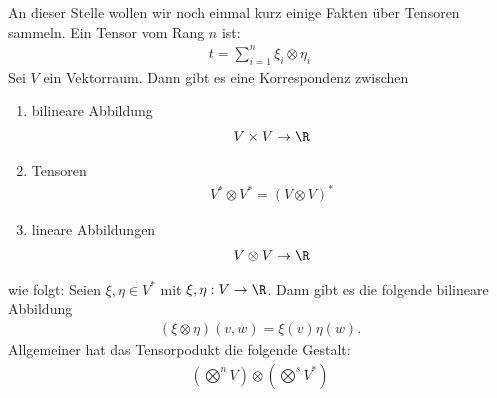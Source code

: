 An dieser Stelle wollen wir noch einmal kurz einige Fakten über Tensoren sammeln.
Ein Tensor vom Rang $n$ ist:
\begin{align}
t = \sum^n_{i=1} \xi_i \otimes \eta_i
\end{align}
Sei $V$ ein Vektorraum. 
Dann gibt es eine Korrespondenz zwischen
\begin{enumerate}
\item bilineare Abbildung 
\begin{align}
V \times V \to \R
\end{align}
\item Tensoren 
\begin{align}
V^* \otimes V^* = (V \otimes V)^*
\end{align}
\item lineare Abbildungen
\begin{align}
V \otimes V \to \R
\end{align}
\end{enumerate}
wie folgt:
Seien $\xi, \eta \in V^*$ mit $\xi, \eta: V \to \R$.
Dann gibt es die folgende bilineare Abbildung 
\begin{align}
(\xi \otimes \eta)(v, w) = \xi (v) \eta (w).
\end{align}
Allgemeiner hat das Tensorpodukt die folgende Gestalt:
\begin{align}
\left( \bigotimes^n V \right) \otimes \left( \bigotimes^s V^* \right)
\end{align}


